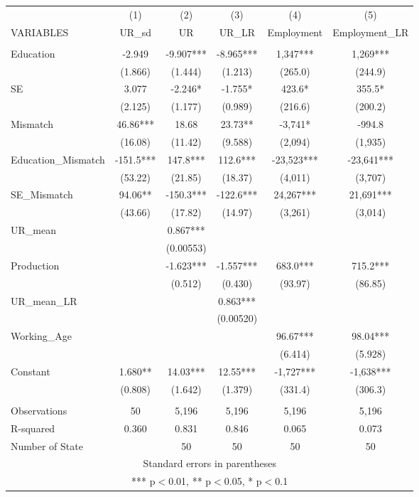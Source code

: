 \documentclass[]{article}
\begin{document}
\begin{tabular}{lccccc} \hline
 & (1) & (2) & (3) & (4) & (5) \\
VARIABLES & UR\_sd & UR & UR\_LR & Employment & Employment\_LR \\ \hline
 &  &  &  &  &  \\
Education & -2.949 & -9.907*** & -8.965*** & 1,347*** & 1,269*** \\
 & (1.866) & (1.444) & (1.213) & (265.0) & (244.9) \\
SE & 3.077 & -2.246* & -1.755* & 423.6* & 355.5* \\
 & (2.125) & (1.177) & (0.989) & (216.6) & (200.2) \\
Mismatch & 46.86*** & 18.68 & 23.73** & -3,741* & -994.8 \\
 & (16.08) & (11.42) & (9.588) & (2,094) & (1,935) \\
Education\_Mismatch & -151.5*** & 147.8*** & 112.6*** & -23,523*** & -23,641*** \\
 & (53.22) & (21.85) & (18.37) & (4,011) & (3,707) \\
SE\_Mismatch & 94.06** & -150.3*** & -122.6*** & 24,267*** & 21,691*** \\
 & (43.66) & (17.82) & (14.97) & (3,261) & (3,014) \\
UR\_mean &  & 0.867*** &  &  &  \\
 &  & (0.00553) &  &  &  \\
Production &  & -1.623*** & -1.557*** & 683.0*** & 715.2*** \\
 &  & (0.512) & (0.430) & (93.97) & (86.85) \\
UR\_mean\_LR &  &  & 0.863*** &  &  \\
 &  &  & (0.00520) &  &  \\
Working\_Age &  &  &  & 96.67*** & 98.04*** \\
 &  &  &  & (6.414) & (5.928) \\
Constant & 1.680** & 14.03*** & 12.55*** & -1,727*** & -1,638*** \\
 & (0.808) & (1.642) & (1.379) & (331.4) & (306.3) \\
 &  &  &  &  &  \\
Observations & 50 & 5,196 & 5,196 & 5,196 & 5,196 \\
R-squared & 0.360 & 0.831 & 0.846 & 0.065 & 0.073 \\
 Number of State &  & 50 & 50 & 50 & 50 \\ \hline
\multicolumn{6}{c}{ Standard errors in parentheses} \\
\multicolumn{6}{c}{ *** p$<$0.01, ** p$<$0.05, * p$<$0.1} \\
\end{tabular}
\end{document}
